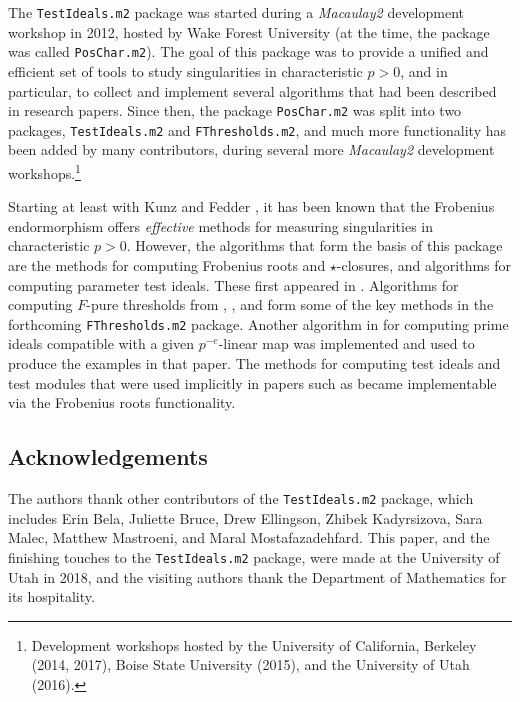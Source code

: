 \documentclass[11pt]{amsart}
\begin{document}
The \texttt{TestIdeals.m2} package was started during a \emph{Macaulay2} development workshop in 2012, hosted by Wake Forest University (at the time, the package was called \texttt{PosChar.m2}).  The goal of this package was to provide a unified and efficient set of tools to study singularities in characteristic $p > 0$, and in particular, to collect and implement several algorithms that had been described in research papers.  Since then, the package \texttt{PosChar.m2} was split into two packages, \texttt{TestIdeals.m2} and \texttt{FThresholds.m2}, and
much more functionality has been added by many contributors, during several more \emph{Macaulay2} development workshops.\footnote{Development workshops hosted by the University of California, Berkeley (2014, 2017), Boise State University (2015), and the University of Utah (2016).}

Starting at least with Kunz \cite{Kunz1969} and Fedder \cite{FedderFPureRat}, it has been known that the Frobenius endormorphism offers \emph{effective} methods for measuring singularities in characteristic $p > 0$.
However, the algorithms that form the basis of this package are the methods for computing Frobenius roots and $\star$-closures, and algorithms for computing parameter test ideals.
These first appeared in \cite{KatzmanParameterTestIdealOfCMRings,BlickleMustataSmithDiscretenessAndRationalityOfFThresholds,BlickleMustataSmithFThresholdsOfHypersurfaces,KatzmanFrobeniusMapsOnInjectiveHulls}.
Algorithms for computing $F$-pure thresholds from \cite{HernandezFInvariantsOfDiagonalHyp}, \cite{HernandezFPureThresholdOfBinomial}, and \cite{HernandezTeixeiraFThresholdFunctions} form some of the key methods in the forthcoming \texttt{FThresholds.m2} package.
Another algorithm in \cite{KatzmanSchwedeAlgorithm} for computing prime ideals compatible with a given $p^{-e}$-linear map was implemented and used to produce the examples in that paper.  The methods for computing test ideals and test modules that were used implicitly in papers such as \cite{BlickleSchwedeTakagiZhang,KatzmanLyubeznikZhangOnDiscretenessAndRationality,SchwedeTuckerTestIdealFiniteMaps} became implementable via the Frobenius roots functionality.




\subsection*{Acknowledgements}
The authors thank other contributors of the \texttt{TestIdeals.m2} package, which includes
Erin Bela, Juliette Bruce, Drew Ellingson, Zhibek Kadyrsizova, Sara Malec, Matthew Mastroeni, and Maral Mostafazadehfard.
This paper, and the finishing touches to the \texttt{TestIdeals.m2} package, were made at the University of Utah in 2018, and the visiting authors thank the Department of Mathematics for its hospitality.
\end{document}
